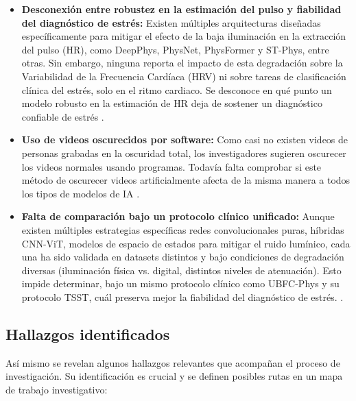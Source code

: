 \begin{itemize}
    \item \textbf{Desconexión entre robustez en la estimación del pulso y fiabilidad del diagnóstico de estrés:} Existen múltiples arquitecturas diseñadas 
    específicamente para mitigar el efecto de la baja iluminación en la extracción del pulso (HR), como DeepPhys, PhysNet, PhysFormer y ST-Phys, entre otras. 
    Sin embargo, ninguna reporta el impacto de esta degradación sobre la Variabilidad de la Frecuencia Cardíaca (HRV) ni sobre tareas de clasificación 
    clínica del estrés, solo en el ritmo cardiaco. Se desconoce en qué punto un modelo robusto en la estimación de HR deja de sostener un diagnóstico confiable de estrés 
    \cite{chatzaki2025overview, morales2022towards, rodriguez2025datasets, acharya2025reliability, rodrigues2025evaluating, zhan2026hrv_long}.
    \item \textbf{Uso de videos oscurecidos por software:} Como casi no existen videos de personas grabadas en la oscuridad total, los investigadores sugieren 
    oscurecer los videos normales usando programas. Todavía falta comprobar si este método de oscurecer videos artificialmente afecta de la misma manera a todos 
    los tipos de modelos de IA \cite{nguyen2024artifact_resilience, ma2025rfbayes, liu2025synrppg, benezeth2024video, liu2023rppgmae}.
    \item \textbf{Falta de comparación bajo un protocolo clínico unificado:} 
    Aunque existen múltiples estrategias específicas redes convolucionales puras, híbridas CNN-ViT, modelos de espacio de estados para mitigar el ruido 
    lumínico, cada una ha sido validada en datasets distintos y bajo condiciones de degradación diversas (iluminación física vs. digital, distintos 
    niveles de atenuación). Esto impide determinar, bajo un mismo protocolo clínico como UBFC-Phys y su protocolo TSST, cuál preserva mejor la fiabilidad 
    del diagnóstico de estrés. \cite{transphys2023, effective2023cross, nguyen2024artifact_resilience, dehnad2024factorize, yu2023physformer, chang2025physvim, yan2025physmamba}.
\end{itemize}


\subsection{Hallazgos identificados}
Así mismo se revelan algunos hallazgos relevantes que acompañan el proceso de investigación. Su identificación es crucial y se definen posibles rutas en un mapa de trabajo investigativo:

